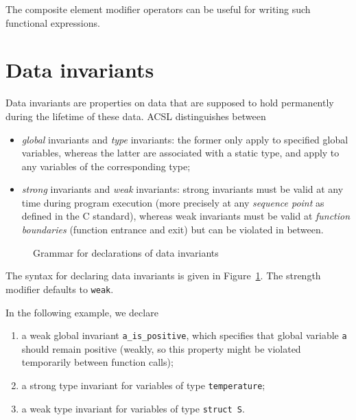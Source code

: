 \begin{example}
  The composite element modifier operators
  can be useful for writing such functional expressions.
\end{example}

\section{Data invariants}
\label{sec:invariants}
Data invariants are properties on data that are supposed to hold
permanently during the lifetime of these data. ACSL distinguishes
between
\begin{itemize}
\item \emph{global} invariants and \emph{type} invariants: the former
  only apply to specified global variables, whereas the latter are
  associated with a static type, and apply to any variables of
  the corresponding type;
\item \emph{strong} invariants and \emph{weak} invariants:
  strong
  invariants must be valid at any time during program execution
  (more precisely at any \emph{sequence point} as defined in the C
  standard), whereas weak invariants must be valid at \emph{function
    boundaries} (function entrance and exit) but can be violated in
  between.
\end{itemize}

\begin{figure}[htp]
  \begin{cadre}
      
    \end{cadre}
  \caption{Grammar for declarations of data invariants}
\label{fig:gram:datainvariants}
\end{figure}

The syntax for declaring data invariants is given in
Figure~\ref{fig:gram:datainvariants}. The strength modifier defaults
to \texttt{weak}.


\begin{example}
  In the following example, we declare
  \begin{enumerate}
  \item a weak global invariant \lstinline|a_is_positive|, which specifies that
    global variable \lstinline|a| should remain positive (weakly, so
    this property might be violated temporarily between function
    calls);
  \item a strong type invariant for variables of type \lstinline|temperature|;
  \item a weak type invariant for variables of type \lstinline|struct S|.
  \end{enumerate}
\end{example}

